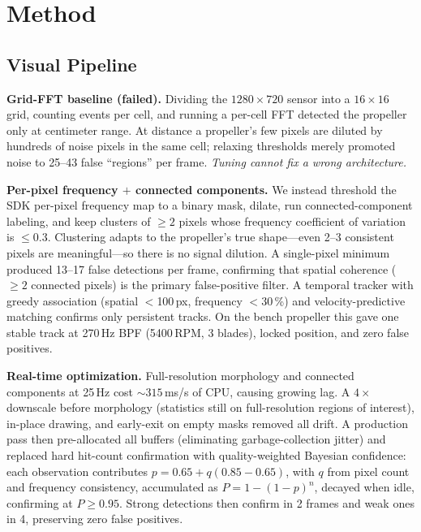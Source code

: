 \documentclass[conference]{IEEEtran}
\begin{document}
\section{Method}

\subsection{Visual Pipeline}
\textbf{Grid-FFT baseline (failed).} Dividing the $1280\times720$ sensor
into a $16\times16$ grid, counting events per cell, and running a per-cell
FFT detected the propeller only at centimeter range. At distance a
propeller's few pixels are diluted by hundreds of noise pixels in the same
cell; relaxing thresholds merely promoted noise to 25--43 false
``regions'' per frame. \emph{Tuning cannot fix a wrong architecture.}

\textbf{Per-pixel frequency $+$ connected components.} We instead threshold
the SDK per-pixel frequency map to a binary mask, dilate, run
connected-component labeling, and keep clusters of $\ge 2$ pixels whose
frequency coefficient of variation is $\le 0.3$. Clustering adapts to the
propeller's true shape---even 2--3 consistent pixels are meaningful---so
there is no signal dilution. A single-pixel minimum produced 13--17 false
detections per frame, confirming that spatial coherence ($\ge 2$ connected
pixels) is the primary false-positive filter. A temporal tracker with
greedy association (spatial $<$100\,px, frequency $<$30\,\%) and
velocity-predictive matching confirms only persistent tracks. On the bench
propeller this gave one stable track at 270\,Hz BPF (5400\,RPM, 3 blades),
locked position, and zero false positives.

\textbf{Real-time optimization.} Full-resolution morphology and connected
components at 25\,Hz cost ${\sim}315$\,ms/s of CPU, causing growing lag. A
$4\times$ downscale before morphology (statistics still on full-resolution
regions of interest), in-place drawing, and early-exit on empty masks
removed all drift. A production pass then pre-allocated all buffers
(eliminating garbage-collection jitter) and replaced hard hit-count
confirmation with quality-weighted Bayesian confidence: each observation
contributes $p = 0.65 + q(0.85-0.65)$, with $q$ from pixel count and
frequency consistency, accumulated as $P = 1-(1-p)^n$, decayed when idle,
confirming at $P \ge 0.95$. Strong detections then confirm in 2 frames and
weak ones in 4, preserving zero false positives.
\end{document}
